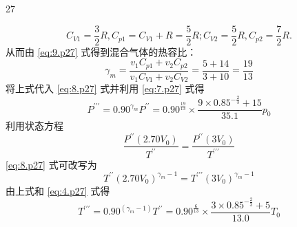 \begin{solution}{27}
\begin{subsolution}
    \begin{equation}
      C_{V 1} = \frac{3}{2} R, C_{p 1} = C_{V 1} + R = \frac{5}{2} R; C_{V 2} = \frac{5}{2} R, C_{p 2} = \frac{7}{2} R.
    \end{equation}
    从而由 \eqref{eq:9.p27} 式得到混合气体的热容比：
    \begin{equation}
      \gamma_{m} = \frac{v_{1} C_{p 1} + v_{2} C_{p 2}}{v_{1} C_{V 1} + v_{2} C_{V 2}} = \frac{5 + 14}{3 + 10} = \frac{19}{13}
    \end{equation}
    将上式代入 \eqref{eq:8.p27} 式并利用 \eqref{eq:7.p27} 式得
    \begin{equation}
      P^{\prime \prime \prime} = 0.90^{\gamma_{m}} P^{\prime \prime} = 0.90^{\frac{19}{13}} \times \frac{9 \times 0.85^{- \frac{2}{3}} + 15}{35.1} p_{0}
      \label{eq:10.p27}
    \end{equation}
    利用状态方程
    \begin{equation}
      \frac{P^{\prime \prime} (2.70 V_{0})}{T^{\prime \prime}} = \frac{P^{\prime \prime} (3 V_{0})}{T^{\prime \prime \prime}}
    \end{equation}
    \eqref{eq:8.p27} 式可改写为
    \begin{equation}
      T^{\prime \prime} (2.70 V_{0})^{\gamma_{m} - 1} = T^{\prime \prime \prime} (3 V_{0})^{\gamma_{m} - 1}
      \label{eq:11.p27}
    \end{equation}
    由上式和 \eqref{eq:4.p27} 式得
    \begin{equation}
      T^{\prime \prime \prime} = 0.90^{(\gamma_{m} - 1)} T^{\prime \prime} = 0.90^{\frac{6}{13}} \times \frac{3 \times 0.85^{- \frac{2}{3}} + 5}{13.0} T_{0}
      \label{eq:12.p27}
    \end{equation}


\end{subsolution}
\end{solution}
